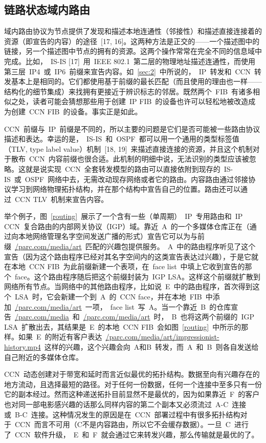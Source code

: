 \subsection{链路状态域内路由}
\label{sec:4.1}
域内路由协议为节点提供了发现和描述本地连通性（邻接性）和描述直接连接着的资源（即宣告的内容）的途径~[17, 16]。这两种方法是正交的——一个描述图中的链接，另一个描述图中节点的拥有的资源。这两个操作常常在完全不同的信息域中完成。比如，~IS-IS [17]~用~IEEE 802.1~第二层的物理地址描述连通性，而使用第三层~IP4~或~IP6~前缀来宣告内容。如~\ref{sec:2}~中所说的，~IP~转发和~CCN~转发基本上是相同的。它们都使用基于前缀的最长匹配（而且使用的理由也一样——结构化的细节集成）来找拥有更接近于辨识标志的邻居。既然两个~FIB~有诸多相似之处，读者可能会猜想那些用于创建~IP FIB~的设备也许可以轻松地被改造成为创建~CCN FIB~的设备。事实正是如此。

CCN~前缀与~IP~前缀是不同的，所以主要的问题是它们是否可能被一些路由协议描述和表达。幸运的是，~IS-IS~和~OSPF~都可以用一个通用的类型标签值（TLV, type label value）机制~[18, 19]~来描述直接连接的资源，并且这个机制对于散布~CCN~内容前缀也很合适。此机制的明细中说，无法识别的类型应该被忽略。这就是说实现~CCN~全套转发模型的路由可以直接依附到现存的~IS-IS~或~OSPF~网络中去，无需改动现存网络或者它的路由。内容路由通过邻接协议学习到网络物理拓扑结构，并在那个结构中宣告自己的位置。路由还可以通过~CCN TLV~机制来宣告内容。

举个例子，图~\ref{routing}~展示了一个含有一些（单周期）~IP~专用路由和~IP CCN~复合路由的内部网关协议（IGP）域。靠近~A~的一个多媒体仓库正在（通过向本地网络管理名字空间发送广播的形式）宣告它可以为与前缀~\url{/parc.com/media/art}~匹配的兴趣包提供服务。~A~中的路由程序听见了这个宣告（因为这个路由程序已经对其名字空间内的这类宣告表达过兴趣），于是它就在本地~CCN FIB~为此前缀新建一个表项，在~face list~中填上它收到宣告的那个~face。这个路由程序随后把这个前缀封装为~IGP LSA。这样这个前缀就扩散到网络所有节点。当网络中的其他路由程序，比如说~E~中的路由程序，首次得到这个~LSA~时，它会新建一个到~A~的~CCN face，并在本地~FIB~中添加~\url{/parc.com/media/art}~一项，~face list~写~A。当一个靠近~B~的仓库宣告~\url{/parc.com/media}~和~\url{/parc.com/media/art}~时，~B~也将这两个前缀的~IGP LSA~扩散出去，其结果是~E~的本地~CCN FIB~会如图~\ref{routing}~中所示的那样。如果~E~的附近有客户表达~\url{/parc.com/media/art/impressionist-history.mp4}~这样的兴趣，这个兴趣会向~A和B~转发，而~A~和~B~则各自发送给自己附近的多媒体仓库。%

CCN~动态创建对于带宽和延时而言近似最优的拓扑结构。数据至向有兴趣存在的地方流动，且选择最短的路径。对于任何一份数据，任何一个连接中至多只有一份它的副本经过。然而这种递送拓扑目前显然不是最优的，因为如果靠近~F~的客户也对同一部电影感兴趣的话那么同样内容的第二个副本又必须流过~A-C~连接或~B-C~连接。这种情况发生的原因是在~CCN~部署过程中有很多拓扑结构对于~CCN~而言不可用（C不是内容路由，所以它不会缓存数据）。一旦~C~进行了~CCN~软件升级，~E~和~F~就会通过它来转发兴趣，那么传输就是最优的了。%

